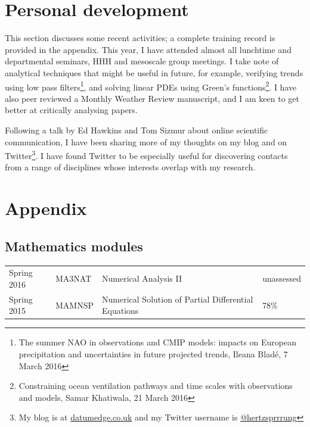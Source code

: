\documentclass[a4paper,11pt]{article}
\begin{document}
\section{Personal development}
This section discusses some recent activities; a complete training record is provided in the appendix.
This year, I have attended almost all lunchtime and departmental seminars, HHH and mesoscale group meetings.  I take note of analytical techniques that might be useful in future, for example, verifying trends using low pass filters\footnote{The summer NAO in observations and CMIP models: impacts on European precipitation and uncertainties in future projected trends, Ileana Bladé, 7 March 2016}, and solving linear PDEs using Green's functions\footnote{Constraining ocean ventilation pathways and time scales with observations and models, Samar Khatiwala, 21 March 2016}.
I have also peer reviewed a Monthly Weather Review manuscript, and I am keen to get better at critically analysing papers.

Following a talk by Ed Hawkins and Tom Sizmur about online scientific communication, I have been sharing more of my thoughts on my blog and on Twitter\footnote{My blog is at \url{datumedge.co.uk} and my Twitter username is \href{https://twitter.com/hertzsprrrung}{@hertzsprrrung}}.  I have found Twitter to be especially useful for discovering contacts from a range of disciplines whose interests overlap with my research.


                                                 


\newpage

\section*{Appendix}

\subsection*{Mathematics modules}
\footnotesize
\begin{tabular}{l l l l}
Spring 2016	& MA3NAT & Numerical Analysis II & unassessed \\
Spring 2015	& MAMNSP & Numerical Solution of Partial Differential Equations  & 78\% \\
\end{tabular}
\end{document}
